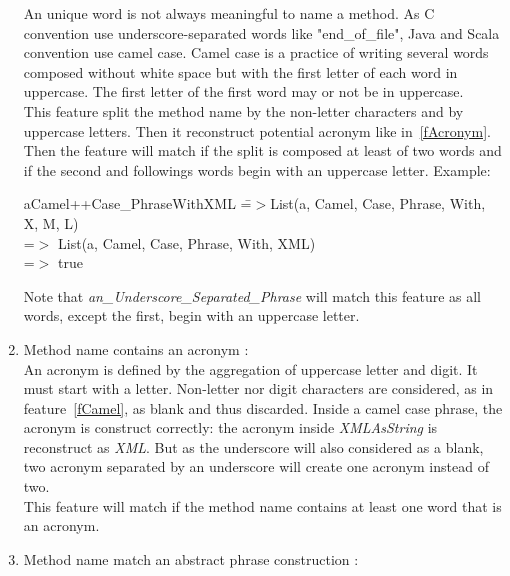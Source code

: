 \documentclass[12pt]{article}
\newcommand{\code}[1]{{\fontfamily{phv}\selectfont \begin{tabbing} #1 \end{tabbing}}}
\begin{document}
\begin{enumerate}
	An unique word is not always meaningful to name a method. As C convention use underscore-separated words like "end\_of\_file", Java and Scala convention use camel case. Camel case is a practice of writing several words composed without white space but with the first letter of each word in uppercase. The first letter of the first word may or not be in uppercase.\\
This feature split the method name by the non-letter characters and by uppercase letters. Then it reconstruct potential acronym like in~\ref{fAcronym}. Then the feature will match if the split is composed at least of two words and if the second and followings words begin with an uppercase letter. Example:
\code{\small aCamel++Case\_PhraseWithXML \= =$>$\small List(a, Camel, Case, Phrase, With, X, M, L)\\
\>\small=$>$ List(a, Camel, Case, Phrase, With, XML)\\
\>\small=$>$ true
}
Note that \textit{an\_Underscore\_Separated\_Phrase} will match this feature as all words, except the first, begin with an uppercase letter.
\item Method name contains an acronym :\label{fAcronym}\\
	An acronym is defined by the aggregation of uppercase letter and digit. It must start with a letter. Non-letter nor digit characters are considered, as in feature~\ref{fCamel}, as blank and thus discarded. Inside a camel case phrase, the acronym is construct correctly: the acronym inside \textit{XMLAsString} is reconstruct as \textit{XML}. But as the underscore will also considered as a blank, two acronym separated by an underscore will create one acronym instead of two.\\
This feature will match if the method name contains at least one word that is an acronym.
\item Method name match an abstract phrase construction : \\


\end{enumerate}
\end{document}
